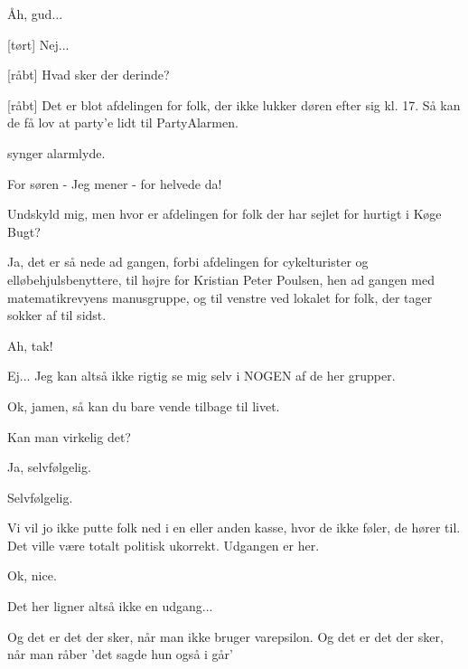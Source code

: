 \documentclass[a4paper,11pt]{article}
\begin{document}
\begin{sketch}
 Åh, gud...

[tørt] Nej...


[råbt] Hvad sker der derinde?

[råbt] Det er blot afdelingen for folk, der ikke lukker døren efter sig kl. 17. Så kan de få lov at party'e lidt til PartyAlarmen.

 synger alarmlyde.


 For søren - Jeg mener - for helvede da!


 Undskyld mig, men hvor er afdelingen for folk der har sejlet for hurtigt i Køge Bugt?

 Ja, det er så nede ad gangen, forbi afdelingen for cykelturister og elløbehjulsbenyttere, til højre for Kristian Peter Poulsen, hen ad gangen med matematikrevyens manusgruppe, og til venstre ved lokalet for folk, der tager sokker af til sidst.

 Ah, tak!


 Ej... Jeg kan altså ikke rigtig se mig selv i NOGEN af de her grupper.

 Ok, jamen, så kan du bare vende tilbage til livet.

 Kan man virkelig det?

 Ja, selvfølgelig. 

 Selvfølgelig.

 Vi vil jo ikke putte folk ned i en eller anden kasse, hvor de ikke føler, de hører til. Det ville være totalt politisk ukorrekt. Udgangen er her.


 Ok, nice.


 Det her ligner altså ikke en udgang...


 Og det er det der sker, når man ikke bruger varepsilon.
 Og det er det der sker, når man råber 'det sagde hun også i går'


\end{sketch}
\end{document}
